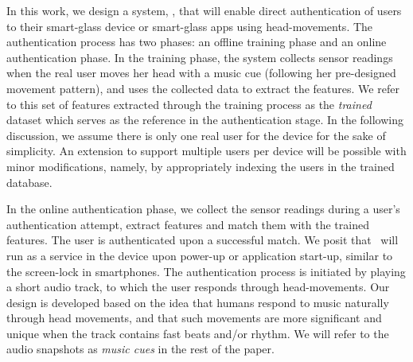 In this work, we design a system, \systemname, that will enable direct authentication of users to their smart-glass device or smart-glass apps using
head-movements.  %
The authentication process has two phases: an offline training phase and an
online authentication phase. In the training phase, the system
collects sensor readings when the real user moves her head with a music cue (following her pre-designed movement pattern), and uses the collected data to
extract the features. We refer to this set of
features extracted through the training process as the {\em trained} dataset
which  serves as the reference in the authentication stage.
In the following discussion, we assume there is only
one real user for the device for the sake of simplicity. An extension to
support multiple users per device will be possible with minor modifications,
namely, by appropriately indexing the users in the trained database.

In the online authentication phase, we collect the sensor readings during a user's authentication attempt, extract features and match them with the trained features.
The user is authenticated upon a successful match.
We posit that \systemname~will run as a service in the device upon power-up or application start-up,
similar to the screen-lock in smartphones.  The authentication process is initiated
by playing a short audio track, to which the user
responds through head-movements. Our design is developed based on the idea that humans respond to music
naturally through head movements, and that such movements are more
significant and unique when the track contains fast beats and/or rhythm.
We will refer to the audio snapshots as {\em music cues} in the rest of the
paper.

